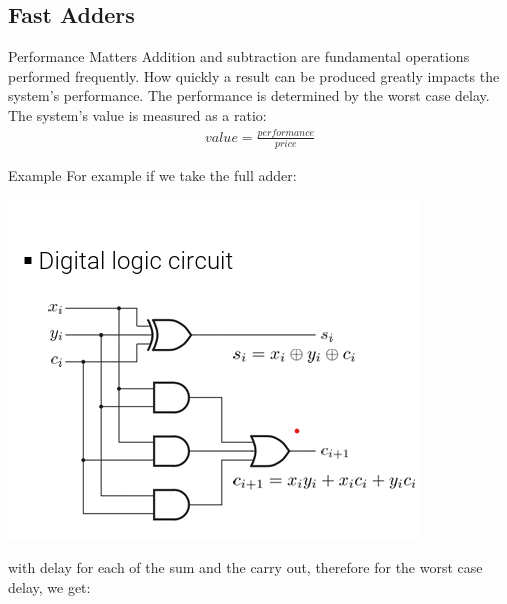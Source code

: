 \subsection{Fast Adders}
\begin{parag}{Performance Matters}
Addition and subtraction are fundamental operations performed frequently. How quickly a result can be produced greatly impacts the system's performance. The performance is determined by the worst case delay.\\
The system's value is measured as a ratio:
\begin{align*}
    value = \frac{performance}{price}
\end{align*}
\begin{subparag}{Example}
    For example if we take the full adder:
    \begin{center}
            \includegraphics[scale=0.8]{32025-03-14.png}
    \end{center}
   with delay for each of the sum and the carry out, therefore for the worst case delay, we get:


\end{subparag}
\end{parag}
